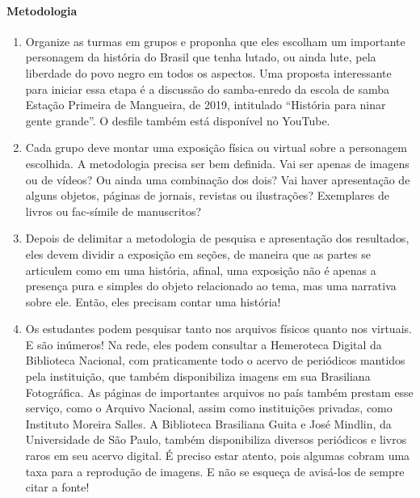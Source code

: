 \documentclass[12pt]{extarticle}
\begin{document}




\paragraph{Metodologia}
\begin{enumerate}
\item
Organize as turmas em grupos e proponha que
eles escolham um importante personagem da história do Brasil que tenha
lutado, ou ainda lute, pela liberdade do povo negro em todos os
aspectos. Uma proposta interessante para iniciar essa etapa é a
discussão do samba-enredo da escola de samba Estação Primeira de
Mangueira, de 2019, intitulado ``História para ninar gente grande''. O
desfile também está disponível no YouTube.




\item
Cada grupo deve montar uma exposição física ou virtual sobre a
personagem escolhida. A metodologia precisa ser bem definida. Vai ser
apenas de imagens ou de vídeos? Ou ainda uma combinação dos dois? Vai
haver apresentação de alguns objetos, páginas de jornais, revistas ou
ilustrações? Exemplares de livros ou fac-símile de manuscritos?

\item
Depois de delimitar a metodologia de pesquisa e apresentação dos
resultados, eles devem dividir a exposição em seções, de maneira que as
partes se articulem como em uma história, afinal, uma exposição não é
apenas a presença pura e simples do objeto relacionado ao tema, mas uma
narrativa sobre ele. Então, eles precisam contar uma história!

\item
Os estudantes podem pesquisar tanto nos arquivos físicos quanto nos
virtuais. E são inúmeros! Na rede, eles podem consultar a Hemeroteca
Digital da Biblioteca Nacional, com praticamente todo o acervo de
periódicos mantidos pela instituição, que também disponibiliza imagens
em sua Brasiliana Fotográfica. As páginas de importantes arquivos no
país também prestam esse serviço, como o Arquivo Nacional, assim como
instituições privadas, como Instituto Moreira Salles. A Biblioteca
Brasiliana Guita e José Mindlin, da Universidade de São Paulo, também
disponibiliza diversos periódicos e livros raros em seu acervo digital.
É preciso estar atento, pois algumas cobram uma taxa para a reprodução
de imagens. E não se esqueça de avisá-los de sempre citar a fonte!


\end{enumerate}
\end{document}
